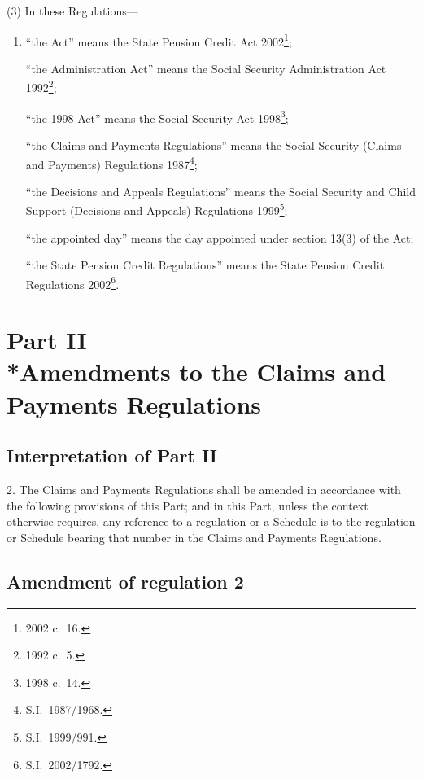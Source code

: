 \documentclass[12pt,a4paper]{article}
\begin{document}
(3) In these Regulations—
\begin{enumerate}\item[]
“the Act” means the State Pension Credit Act 2002\footnote{2002 c.\ 16.};

“the Administration Act” means the Social Security Administration Act 1992\footnote{1992 c.\ 5.};

“the 1998 Act” means the Social Security Act 1998\footnote{1998 c.\ 14.};

“the Claims and Payments Regulations” means the Social Security (Claims and Payments) Regulations 1987\footnote{S.I.\ 1987/1968.};

“the Decisions and Appeals Regulations” means the Social Security and Child Support (Decisions and Appeals) Regulations 1999\footnote{S.I.\ 1999/991.};

“the appointed day” means the day appointed under section 13(3) of the Act;

“the State Pension Credit Regulations” means the State Pension Credit Regulations 2002\footnote{S.I.\ 2002/1792.}.
\end{enumerate}

\section[Part II --- Amendments to the Claims and Payments Regulations]{Part II\\*Amendments to the Claims and Payments Regulations}

\subsection[2. Interpretation of Part II]{Interpretation of Part II}

\renewcommand\parthead{--- Part II}

2.  The Claims and Payments Regulations shall be amended in accordance with the following provisions of this Part; and in this Part, unless the context otherwise requires, any reference to a regulation or a Schedule is to the regulation or Schedule bearing that number in the Claims and Payments Regulations.

\subsection[3. Amendment of regulation 2]{Amendment of regulation 2}
\end{document}
